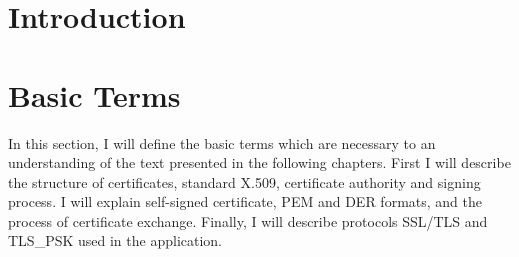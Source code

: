 \documentclass[
  digital, %
  notable,   %
  lof,     %
  lot,     %
]{fithesis3}
\begin{document}
\chapter{Introduction}


\chapter{Basic Terms}
In this section, I will define the basic terms which are necessary to an understanding of the 
text presented in the following chapters. First %
I will describe the structure of certificates, standard X.509, certificate authority and 
signing process. I will explain self-signed certificate, PEM and DER formats, and the process 
of certificate exchange. Finally, I will describe protocols SSL/TLS and TLS\_PSK used in the 
application.
\end{document}
